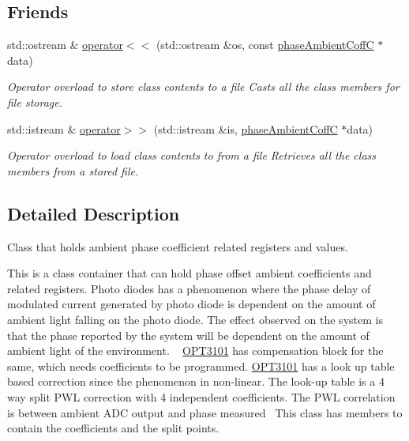 \subsection*{Friends}
\begin{DoxyCompactItemize}
\item 
std\+::ostream \& \mbox{\hyperlink{class_o_p_t3101_1_1phase_ambient_coff_c_a3febbb121799f99cb3f3f6578b43fae9}{operator$<$$<$}} (std\+::ostream \&os, const \mbox{\hyperlink{class_o_p_t3101_1_1phase_ambient_coff_c}{phase\+Ambient\+CoffC}} $\ast$data)
\begin{DoxyCompactList}\small\item\em Operator overload to store class contents to a file Casts all the class members for file storage. \end{DoxyCompactList}\item 
std\+::istream \& \mbox{\hyperlink{class_o_p_t3101_1_1phase_ambient_coff_c_a1aec354cf48fdc653937a8168af6c78c}{operator$>$$>$}} (std\+::istream \&is, \mbox{\hyperlink{class_o_p_t3101_1_1phase_ambient_coff_c}{phase\+Ambient\+CoffC}} $\ast$data)
\begin{DoxyCompactList}\small\item\em Operator overload to load class contents to from a file Retrieves all the class members from a stored file. \end{DoxyCompactList}\end{DoxyCompactItemize}


\subsection{Detailed Description}
Class that holds ambient phase coefficient related registers and values. 

This is a class container that can hold phase offset ambient coefficients and related registers. Photo diodes has a phenomenon where the phase delay of modulated current generated by photo diode is dependent on the amount of ambient light falling on the photo diode. The effect observed on the system is that the phase reported by the system will be dependent on the amount of ambient light of the environment. ~\newline
 \mbox{\hyperlink{namespace_o_p_t3101}{O\+P\+T3101}} has compensation block for the same, which needs coefficients to be programmed. \mbox{\hyperlink{namespace_o_p_t3101}{O\+P\+T3101}} has a look up table based correction since the phenomenon in non-\/linear. The look-\/up table is a 4 way split P\+WL correction with 4 independent coefficients. The P\+WL correlation is between ambient A\+DC output and phase measured~\newline
 This class has members to contain the coefficients and the split points. 

